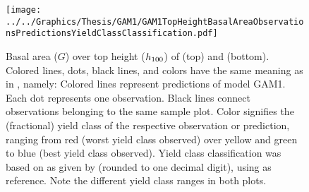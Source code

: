 \begin{figure}[h]
  \centering
  \texttt{[image: ../../Graphics/Thesis/GAM1/GAM1TopHeightBasalAreaObservationsPredictionsYieldClassClassification.pdf]}
  \caption{Basal area (\(G\)) over top height (\(h_{100}{}\)) of \Beech{} (top) and \Spruce{} (bottom).  Colored lines, dots, black lines, and colors have the same meaning as in , namely:  Colored lines represent predictions of model GAM1.  Each dot represents one observation.  Black lines connect observations belonging to the same sample plot.  Color signifies the (fractional) yield class of the respective observation or prediction, ranging from red (worst yield class observed) over yellow and green to blue (best yield class observed).  Yield class classification was based on \ProductivityIndexText{} as given by  (rounded to one decimal digit), using  as reference.  Note the different yield class ranges in both plots.}
  \label{fig:GAM1TopHeightBasalAreaObservationsPredictionsYieldClassClassification}
\end{figure}

\clearpage{}

